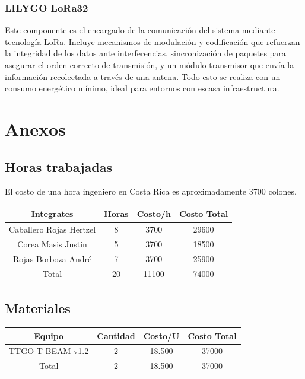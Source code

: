 \documentclass[conference]{IEEEtran}
\begin{document}
\vspace{2mm}

\subsubsection*{LILYGO LoRa32}

\vspace{2mm}

Este componente es el encargado de la comunicación del sistema mediante tecnología LoRa. Incluye mecanismos de modulación y codificación que refuerzan la integridad de los datos ante interferencias, sincronización de paquetes para asegurar el orden correcto de transmisión, y un módulo transmisor que envía la información recolectada a través de una antena. Todo esto se realiza con un consumo energético mínimo, ideal para entornos con escasa infraestructura.

\section{\textbf{Anexos}}

\subsection{Horas trabajadas}

El costo de una hora ingeniero en Costa Rica es aproximadamente 3700 colones.

\begin{center}
\begin{tabular} {| c | c | c | c |}
	\hline
	Integrates & Horas & Costo/h & Costo Total \\
	\hline
	Caballero Rojas Hertzel & 8 & 3700 & 29600 \\
	Corea Masis Justin & 5 & 3700 & 18500 \\
	Rojas Borboza André & 7 & 3700 & 25900 \\
	Total & 20 & 11100 & 74000 \\
	\hline
\end{tabular}
\end{center}

\subsection{Materiales}
\begin{center}
\begin{tabular} {| c | c | c | c |}
	\hline
	Equipo & Cantidad & Costo/U & Costo Total\\
	\hline
	TTGO T-BEAM v1.2 & 2 & 18.500 & 37000 \\
	Total & 2 & 18.500 & 37000 \\
	\hline
\end{tabular}
\end{center}
\end{document}
